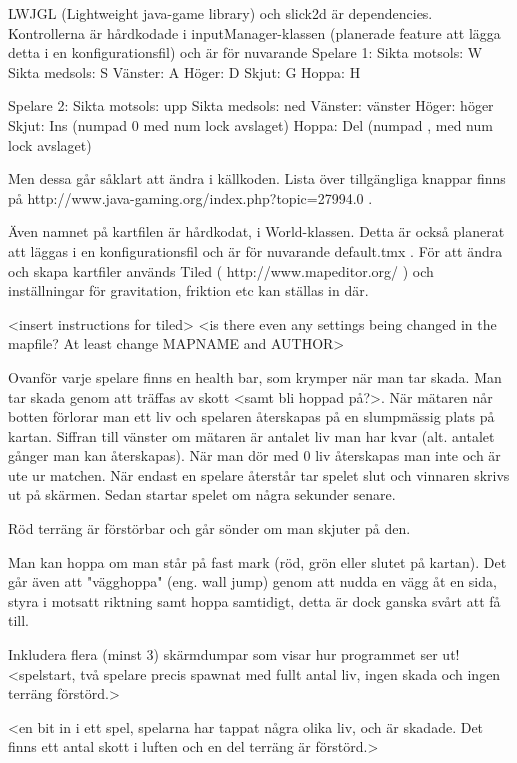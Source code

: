 LWJGL (Lightweight java-game library) och slick2d är dependencies.
Kontrollerna är hårdkodade i inputManager-klassen (planerade feature att lägga detta i en konfigurationsfil) och är för nuvarande
Spelare 1:
Sikta motsols: W
Sikta medsols: S
Vänster: A
Höger: D
Skjut: G
Hoppa: H

Spelare 2:
Sikta motsols: upp
Sikta medsols: ned
Vänster: vänster
Höger: höger
Skjut: Ins (numpad 0 med num lock avslaget)
Hoppa: Del (numpad , med num lock avslaget)

Men dessa går såklart att ändra i källkoden. Lista över tillgängliga knappar finns på http://www.java-gaming.org/index.php?topic=27994.0 .


Även namnet på kartfilen är hårdkodat, i World-klassen. Detta är också planerat att läggas i en konfigurationsfil och är för nuvarande default.tmx .
För att ändra och skapa kartfiler används Tiled ( http://www.mapeditor.org/ ) och inställningar för gravitation, friktion etc kan ställas in där.

<insert instructions for tiled>
<is there even any settings being changed in the mapfile? At least change MAPNAME and AUTHOR>

Ovanför varje spelare finns en health bar, som krymper när man tar skada. Man tar skada genom att träffas av skott <samt bli hoppad på?>. När mätaren når botten förlorar man ett liv och spelaren återskapas på en slumpmässig plats på kartan. Siffran till vänster om mätaren är antalet liv man har kvar (alt. antalet gånger man kan återskapas). När man dör med 0 liv återskapas man inte och är ute ur matchen. När endast en spelare återstår tar spelet slut och vinnaren skrivs ut på skärmen. Sedan startar spelet om några sekunder senare.

Röd terräng är förstörbar och går sönder om man skjuter på den.

Man kan hoppa om man står på fast mark (röd, grön eller slutet på kartan). Det går även att "vägghoppa" (eng. wall jump) genom att nudda en vägg åt en sida, styra i motsatt riktning samt hoppa samtidigt, detta är dock ganska svårt att få till.


Inkludera flera (minst 3) skärmdumpar som visar hur programmet ser ut!\\
<spelstart, två spelare precis spawnat med fullt antal liv, ingen skada och ingen terräng förstörd.>

<en bit in i ett spel, spelarna har tappat några olika liv, och är skadade. Det finns ett antal skott i luften och en del terräng är förstörd.>

